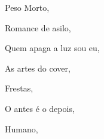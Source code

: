 \begin{multicols}{2}
\begin{enumerate}
{\item Peso Morto, {}
\item Romance de asilo, {}
\item Quem apaga a luz sou eu, {}
\item As artes do cover, {}
\item Frestas, {}
\item O antes é o depois, {}
\item Humano, {}
}
\end{enumerate}
\end{multicols}

\pagebreak
